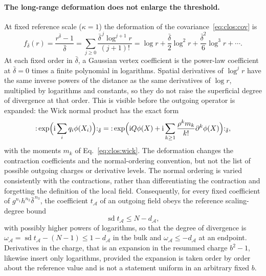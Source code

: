 \documentclass[11pt,a4paper]{article}
\numberwithin{equation}{section}
\newcommand{\db}{\bar\delta}
\begin{document}
\paragraph{The long-range deformation does not enlarge the threshold.} At fixed reference scale ($\kappa=1$) the
deformation of the covariance~\eqref{eq:clos:cov} is
\begin{equation}
 f_{\db}(r)=\frac{r^{\db}-1}{\db}=\sum_{j\ge0}\frac{\db^{\,j}\log^{j+1}r}{(j+1)!}
 =\log r+\frac{\db}{2}\log^2r+\frac{\db^2}{6}\log^3r+\cdots.
 \label{eq:clos:deform}
\end{equation}
At each fixed order in $\db$, a Gaussian vertex coefficient is the power-law coefficient at $\db=0$ times a finite
polynomial in logarithms. Spatial derivatives of $\log^jr$ have the same inverse powers of the distance as the same
derivatives of $\log r$, multiplied by logarithms and constants, so they do not raise the superficial degree of
divergence at that order. This is visible before the outgoing operator is expanded: the Wick normal product has the
exact form
\begin{equation}
 {:}\exp\Bigl(\mathrm i\sum_iq_i\phi(X_i)\Bigr){:}_{\db}
 ={:}\exp\Bigl(\mathrm iQ\phi(X)+\mathrm i\sum_{k\ge1}\frac{\rho^km_k}{k!}\partial^k\phi(X)\Bigr){:}_{\db},
\end{equation}
with the moments $m_k$ of Eq.~\eqref{eq:clos:wick}. The deformation changes the contraction coefficients and the
normal-ordering convention, but not the list of possible outgoing charges or derivative levels. The normal ordering is
varied consistently with the contractions, rather than differentiating the contraction and forgetting the definition of
the local field. Consequently, for every fixed coefficient of $g^{n_1}h^{n_2}\db^{\,n_3}$, the coefficient
$t_{\mathcal A}$ of an outgoing field obeys the reference scaling-degree bound
\begin{equation}
 \operatorname{sd}t_{\mathcal A}\le N-d_{\mathcal A},
 \label{eq:clos:sd}
\end{equation}
with possibly higher powers of logarithms, so that the degree of divergence is
$\omega_{\mathcal A}=\operatorname{sd}t_{\mathcal A}-(N-1)\le1-d_{\mathcal A}$ in the bulk and
$\omega_{\mathcal A}\le-d_{\mathcal A}$ at an endpoint. Derivatives in the charge, that is an expansion in the resummed
charge $b^2-1$, likewise insert only logarithms, provided the expansion is taken order by order about the reference
value and is not a statement uniform in an arbitrary fixed $b$.
\end{document}
